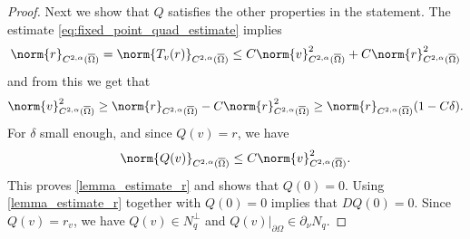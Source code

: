 \documentclass[11pt,a4paper]{amsart}
\theoremstyle{definition}
\numberwithin{equation}{section}
\newcommand{\ol}[1]{\overline{#1}}
\newcommand{\p}{\partial}
\newcommand{\Om}{\Omega}
\begin{document}
\begin{proof}
Next we show that $Q$ satisfies the other properties in the statement. 
The estimate \eqref{eq:fixed_point_quad_estimate} implies
\begin{equation*}
    \norm{r}_{C^{2,\alpha}(\ol{\Om})} = \norm{T_v(r)}_{C^{2,\alpha}(\ol{\Om})} \leq C\norm{v}_{C^{2,\alpha}(\ol{\Om})}^2+C\norm{r}_{C^{2,\alpha}(\ol{\Om})}^2
\end{equation*}
and from this we get that
\begin{equation*}
    \norm{v}_{C^{2,\alpha}(\ol{\Om})}^2\geq \norm{r}_{C^{2,\alpha}(\ol{\Om})} - C\norm{r}_{C^{2,\alpha}(\ol{\Om})}^2 \geq \norm{r}_{C^{2,\alpha}(\ol{\Om})}(1-C\delta).
\end{equation*}
For $\delta$ small enough, and since \( Q(v) = r \), we have
\begin{equation*}
	\norm{Q(v)}_{C^{2,\alpha}(\ol{\Om})} \leq C\norm{v}_{C^{2,\alpha}(\ol{\Om})}^2.
\end{equation*}
This proves \eqref{lemma_estimate_r} and shows that $Q(0) = 0$.
Using \eqref{lemma_estimate_r} together with $Q(0) = 0$ implies that $DQ(0) = 0$.
Since $Q(v) = r_v$, we have $Q(v) \in N_q^{\perp}$ and $Q(v)|_{\p \Omega} \in \p_{\nu}N_q$.


\end{proof}
\end{document}
